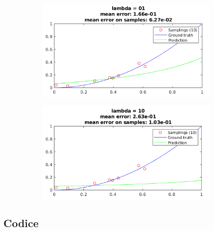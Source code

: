 \documentclass[12pt]{article}
\begin{document}
\begin{figure}[H]
  \centering
  \begin{subfigure}{0.45\textwidth}
    \includegraphics[width=\textwidth]{plots/regression_lambda/lambda_eq_1.png}
  \end{subfigure}
  \begin{subfigure}{0.45\textwidth}
    \includegraphics[width=\textwidth]{plots/regression_lambda/lambda_eq_10.png}
  \end{subfigure}
\end{figure}

\newpage
\subsection{Codice}

\end{document}

